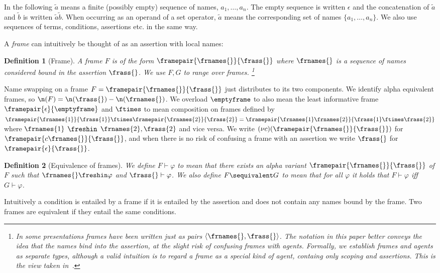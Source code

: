 \documentclass{eptcs}
\newtheorem{definition}{Definition}
\theoremstyle{definition}
\begin{document}
In the following $\tilde{a}$ means a finite (possibly empty) sequence of names, $a_1,\ldots,a_n$. The empty sequence is written $\epsilon$ and the concatenation of $\tilde{a}$ and $\tilde{b}$ is written $\tilde{a} \tilde{b}$.
When occurring as an operand of a set operator, $\tilde{a}$ means the corresponding set of names $\{a_1,\ldots, a_n\}$. We also use sequences of terms, conditions, assertions etc. in the same way.

A {\em frame} can intuitively be thought of as an assertion with local names:
\begin{definition}[Frame]
\label{def:frame}
A {\em frame} $F$ is of the form $\framepair{\frnames{}}{\frass{}}$ where
$\frnames{}$ is a sequence of names considered bound in
the assertion 
$\frass{}$. We use $F,G$ to range over frames. \footnote{In some presentations
frames have been written just as pairs $\langle \frnames{},\frass{} \rangle$.
The notation in this paper better conveys the idea that the names bind into the
assertion, at the slight risk of confusing frames with agents. Formally, we
establish frames and agents as separate types, although a valid intuition is to
regard a frame as a special kind of agent, containg only scoping and assertions.
This is the view taken in~\cite{abadi.fournet:mobile-values}. }

\end{definition}
Name swapping on a frame $F =
\framepair{\frnames{}}{\frass{}}$ just distributes to its two components. We
identify
alpha equivalent frames, so $\n(F) = \n(\frass{}) - \n(\frnames{})$. 
We overload $\emptyframe$ to also mean the least informative frame
$\framepair{\epsilon}{\emptyframe}$ and $\ftimes$ to mean composition on frames
defined by $\framepair{\frnames{1}}{\frass{1}} \ftimes
\framepair{\frnames{2}}{\frass{2}} = 
\framepair{\frnames{1} \frnames{2}}{\frass{1} \ftimes \frass{2}}$ where
$\frnames{1}$ $\freshin$ $\frnames{2},\frass{2}$ and vice versa. We write
$(\nu c)(\framepair{\frnames{}}{\frass{}})$
for $\framepair{c\frnames{}}{\frass{}}$, and when there is
no risk of confusing a frame with an assertion we write $\frass{}$ for
$\framepair{\epsilon}{\frass{}}$.

\begin{definition}[Equivalence of frames]\label{def:frame-equivalence}
We define $F \vdash \varphi$ to mean that there exists an alpha variant
$\framepair{\frnames{}}{\frass{}}$ of $F$ such that  $\frnames{}
\freshin \varphi$ and $\frass{} \vdash \varphi$. We also define 
$F\sequivalent G$ to mean that for all $\varphi$ it holds that $ F \vdash
\varphi$ iff $ G \vdash \varphi$.
\end{definition}
Intuitively a condition is entailed by a frame if it is entailed by the
assertion and does not contain any names bound by the frame. 
Two frames are equivalent if they entail the same conditions.
\end{document}
